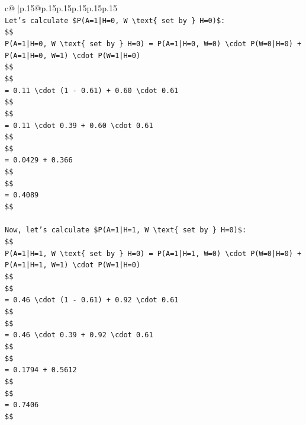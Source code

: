 \documentclass{article}
\begin{document}
{\begin{supertabular}{c@{$\;$}|p{.15\linewidth}@{}p{.15\linewidth}p{.15\linewidth}p{.15\linewidth}p{.15\linewidth}p{.15\linewidth}}
{{{\\ 
\texttt{Let's calculate \$P(A=1|H=0, W \textbackslash{}text\{ set by \} H=0)\$:} \\
\texttt{\$\$} \\
\texttt{P(A=1|H=0, W \textbackslash{}text\{ set by \} H=0) = P(A=1|H=0, W=0) \textbackslash{}cdot P(W=0|H=0) + P(A=1|H=0, W=1) \textbackslash{}cdot P(W=1|H=0)} \\
\texttt{\$\$} \\
\texttt{\$\$} \\
\texttt{= 0.11 \textbackslash{}cdot (1 {-} 0.61) + 0.60 \textbackslash{}cdot 0.61} \\
\texttt{\$\$} \\
\texttt{\$\$} \\
\texttt{= 0.11 \textbackslash{}cdot 0.39 + 0.60 \textbackslash{}cdot 0.61} \\
\texttt{\$\$} \\
\texttt{\$\$} \\
\texttt{= 0.0429 + 0.366} \\
\texttt{\$\$} \\
\texttt{\$\$} \\
\texttt{= 0.4089} \\
\texttt{\$\$} \\
\\ 
\texttt{Now, let's calculate \$P(A=1|H=1, W \textbackslash{}text\{ set by \} H=0)\$:} \\
\texttt{\$\$} \\
\texttt{P(A=1|H=1, W \textbackslash{}text\{ set by \} H=0) = P(A=1|H=1, W=0) \textbackslash{}cdot P(W=0|H=0) + P(A=1|H=1, W=1) \textbackslash{}cdot P(W=1|H=0)} \\
\texttt{\$\$} \\
\texttt{\$\$} \\
\texttt{= 0.46 \textbackslash{}cdot (1 {-} 0.61) + 0.92 \textbackslash{}cdot 0.61} \\
\texttt{\$\$} \\
\texttt{\$\$} \\
\texttt{= 0.46 \textbackslash{}cdot 0.39 + 0.92 \textbackslash{}cdot 0.61} \\
\texttt{\$\$} \\
\texttt{\$\$} \\
\texttt{= 0.1794 + 0.5612} \\
\texttt{\$\$} \\
\texttt{\$\$} \\
\texttt{= 0.7406} \\
\texttt{\$\$} \\
}}}
\end{supertabular}}
\end{document}

